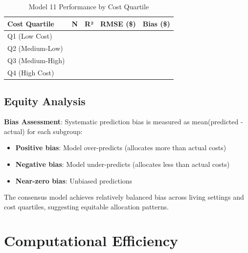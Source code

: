 \begin{table}[h]
\centering
\caption{Model 11 Performance by Cost Quartile}
\label{tab:model11_cost_quartile}
\begin{tabular}{lrrrc}
\toprule
\textbf{Cost Quartile} & \textbf{N} & \textbf{R²} & \textbf{RMSE (\$)} & \textbf{Bias (\$)} \\
\midrule
Q1 (Low Cost) & \ModelElevenSubgroupCostQOneN{} & \ModelElevenSubgroupCostQOneRSquared{} & \ModelElevenSubgroupCostQOneRMSE{} & \ModelElevenSubgroupCostQOneBias{} \\
Q2 (Medium-Low) & \ModelElevenSubgroupCostQTwoN{} & \ModelElevenSubgroupCostQTwoRSquared{} & \ModelElevenSubgroupCostQTwoRMSE{} & \ModelElevenSubgroupCostQTwoBias{} \\
Q3 (Medium-High) & \ModelElevenSubgroupCostQThreeN{} & \ModelElevenSubgroupCostQThreeRSquared{} & \ModelElevenSubgroupCostQThreeRMSE{} & \ModelElevenSubgroupCostQThreeBias{} \\
Q4 (High Cost) & \ModelElevenSubgroupCostQFourN{} & \ModelElevenSubgroupCostQFourRSquared{} & \ModelElevenSubgroupCostQFourRMSE{} & \ModelElevenSubgroupCostQFourBias{} \\
\bottomrule
\end{tabular}
\end{table}

\subsection{Equity Analysis}

\textbf{Bias Assessment}: Systematic prediction bias is measured as mean(predicted - actual) for each subgroup:
\begin{itemize}
    \item \textbf{Positive bias}: Model over-predicts (allocates more than actual costs)
    \item \textbf{Negative bias}: Model under-predicts (allocates less than actual costs)
    \item \textbf{Near-zero bias}: Unbiased predictions
\end{itemize}

The consensus model achieves relatively balanced bias across living settings and cost quartiles, suggesting equitable allocation patterns.

\section{Computational Efficiency}

